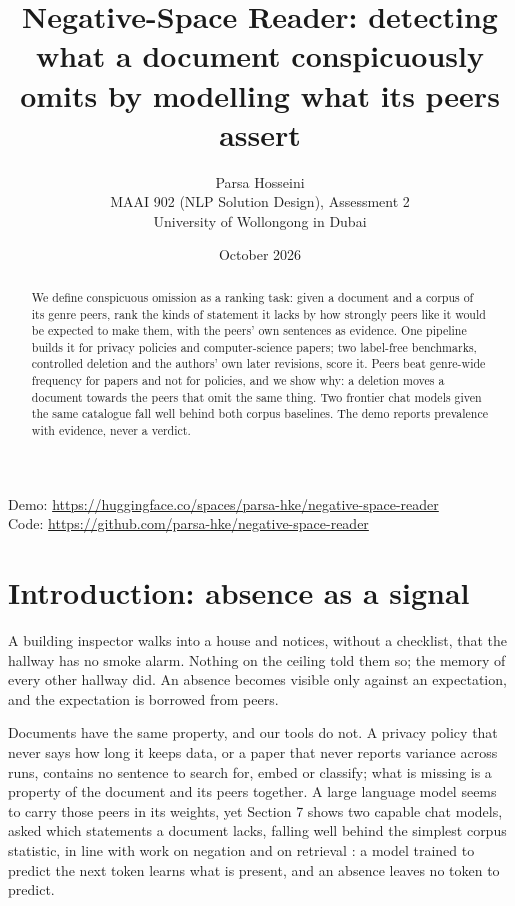 \documentclass[11pt,a4paper]{article}
\title{Negative-Space Reader: detecting what a document conspicuously omits by modelling what its peers assert}
\author{Parsa Hosseini \\ MAAI 902 (NLP Solution Design), Assessment 2 \\ University of Wollongong in Dubai}
\date{October 2026}
\begin{document}
\maketitle
\begin{center}\small
Demo: \url{https://huggingface.co/spaces/parsa-hke/negative-space-reader}\\
Code: \url{https://github.com/parsa-hke/negative-space-reader}
\end{center}

\begin{abstract}

We define conspicuous omission as a ranking task: given a document and a corpus of its genre peers, rank the kinds of statement it lacks by how strongly peers like it would be expected to make them, with the peers' own sentences as evidence. One pipeline builds it for privacy policies and computer-science papers; two label-free benchmarks, controlled deletion and the authors' own later revisions, score it. Peers beat genre-wide frequency for papers and not for policies, and we show why: a deletion moves a document towards the peers that omit the same thing. Two frontier chat models given the same catalogue fall well behind both corpus baselines. The demo reports prevalence with evidence, never a verdict.

\end{abstract}

\section{Introduction: absence as a signal}

A building inspector walks into a house and notices, without a checklist, that the hallway has no smoke alarm. Nothing on the ceiling told them so; the memory of every other hallway did. An absence becomes visible only against an expectation, and the expectation is borrowed from peers.

Documents have the same property, and our tools do not. A privacy policy that never says how long it keeps data, or a paper that never reports variance across runs, contains no sentence to search for, embed or classify; what is missing is a property of the document and its peers together. A large language model seems to carry those peers in its weights, yet Section 7 shows two capable chat models, asked which statements a document lacks, falling well behind the simplest corpus statistic, in line with work on negation \cite{r1,r2} and on retrieval \cite{r3}: a model trained to predict the next token learns what is present, and an absence leaves no token to predict.
\end{document}
